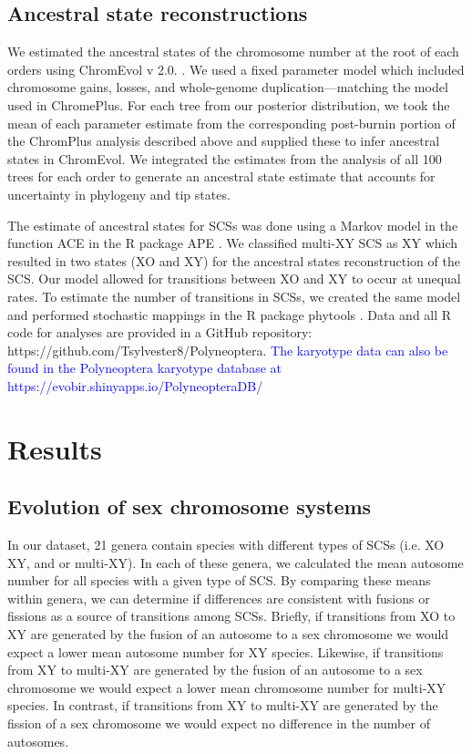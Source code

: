 \documentclass[]{rsos}%
\begin{document}
\subsection{Ancestral state reconstructions}
We estimated the ancestral states of the chromosome number at the root of each orders using ChromEvol v 2.0. \cite{glick2014chromevol, mayrose2009chromevol}.
We used a fixed parameter model which included chromosome gains, losses, and whole-genome duplication---matching the model used in ChromePlus.
For each tree from our posterior distribution, we took the mean of each parameter estimate from the corresponding post-burnin portion of the ChromPlus analysis described above and supplied these to infer ancestral states in ChromEvol.
We integrated the estimates from the analysis of all 100 trees for each order to generate an ancestral state estimate that accounts for uncertainty in phylogeny and tip states. 

The estimate of ancestral states for SCSs was done using a Markov model in the function ACE in the R package APE \cite{Paradis2018}.
We classified multi-XY SCS as XY which resulted in two states (XO and XY) for the ancestral states reconstruction of the SCS. 
Our model allowed for transitions between XO and XY to occur at unequal rates.
To estimate the number of transitions in SCSs, we created the same model and performed stochastic mappings in the R package phytools \cite{revell2012phytools}.
Data and all R code for analyses are provided in a GitHub repository: https://github.com/Tsylvester8/Polyneoptera. \textcolor{blue}{The karyotype data can also be found in the Polyneoptera karyotype database at https://evobir.shinyapps.io/PolyneopteraDB/}

\section{Results}

\subsection{Evolution of sex chromosome systems}
In our dataset, 21 genera contain species with different types of SCSs (i.e. XO XY, and or multi-XY).
In each of these genera, we calculated the mean autosome number for all species with a given type of SCS.
By comparing these means within genera, we can determine if differences are consistent with fusions or fissions as a source of transitions among SCSs.
Briefly, if transitions from XO to XY are generated by the fusion of an autosome to a sex chromosome we would expect a lower mean autosome number for XY species.
Likewise, if transitions from XY to multi-XY are generated by the fusion of an autosome to a sex chromosome we would expect a lower mean chromosome number for multi-XY species.
In contrast, if transitions from XY to multi-XY are generated by the fission of a sex chromosome we would expect no difference in the number of autosomes.
\end{document}
